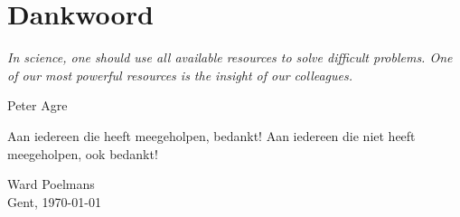 \cleardoublepage

\normalsize

\chapter{Dankwoord}
\setlength{\epigraphrule}{0pt}
\setlength{\epigraphwidth}{0.75\textwidth}
\epigraph{\textit{In science, one should use all available resources to solve difficult problems. One of our most powerful resources is the insight of our colleagues.}}{Peter Agre}

Aan iedereen die heeft meegeholpen, bedankt! Aan iedereen die niet heeft meegeholpen, ook bedankt!


\vspace*{\fill}

\begin{flushright}
Ward Poelmans \\
Gent, \today
\end{flushright}

\vspace*{\fill}


